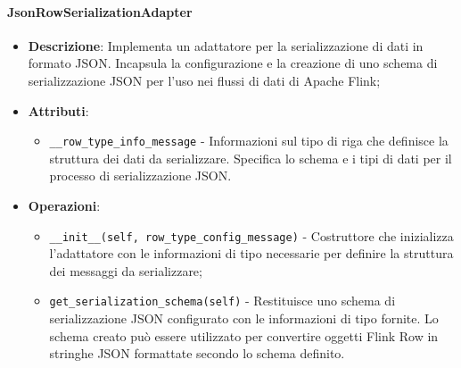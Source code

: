 \documentclass[10pt]{article}
\begin{document}
    \paragraph{JsonRowSerializationAdapter}
    \begin{itemize} 
    \item \textbf{Descrizione}: Implementa un adattatore per la serializzazione di dati in formato JSON. Incapsula la configurazione e la creazione di uno schema di serializzazione JSON per l'uso nei flussi di dati di Apache Flink;
    \item \textbf{Attributi}:
    \begin{itemize}
        \item \texttt{\_\_row\_type\_info\_message} - Informazioni sul tipo di riga che definisce la struttura dei dati da serializzare. Specifica lo schema e i tipi di dati per il processo di serializzazione JSON.
    \end{itemize}
    
    \item \textbf{Operazioni}:
    \begin{itemize}
        \item \texttt{\_\_init\_\_(self, row\_type\_config\_message)} - Costruttore che inizializza l'adattatore con le informazioni di tipo necessarie per definire la struttura dei messaggi da serializzare;
        
        \item \texttt{get\_serialization\_schema(self)} - Restituisce uno schema di serializzazione JSON configurato con le informazioni di tipo fornite. Lo schema creato può essere utilizzato per convertire oggetti Flink Row in stringhe JSON formattate secondo lo schema definito.
    \end{itemize}
    \end{itemize}
\end{document}
